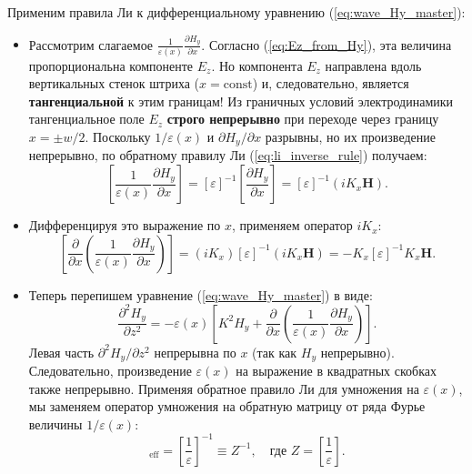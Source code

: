 \documentclass[a4paper,11pt]{article}
\begin{document}
Применим правила Ли к дифференциальному уравнению (\ref{eq:wave_Hy_master}):
\begin{itemize}
    \item Рассмотрим слагаемое $\frac{1}{\varepsilon(x)} \frac{\partial H_y}{\partial x}$. 
    Согласно (\ref{eq:Ez_from_Hy}), эта величина пропорциональна компоненте $E_z$. Но компонента $E_z$ направлена вдоль вертикальных стенок штриха ($x = \text{const}$) и, следовательно, является \textbf{тангенциальной} к этим границам! Из граничных условий электродинамики тангенциальное поле $E_z$ \textbf{строго непрерывно} при переходе через границу $x = \pm w/2$.
    Поскольку $1/\varepsilon(x)$ и $\partial H_y / \partial x$ разрывны, но их произведение непрерывно, по обратному правилу Ли (\ref{eq:li_inverse_rule}) получаем:
    \begin{equation}
        \left[ \frac{1}{\varepsilon(x)} \frac{\partial H_y}{\partial x} \right] = [\varepsilon]^{-1} \left[ \frac{\partial H_y}{\partial x} \right] = [\varepsilon]^{-1} (i K_x \mathbf{H}).
    \end{equation}
    \item Дифференцируя это выражение по $x$, применяем оператор $i K_x$:
    \begin{equation}
        \left[ \frac{\partial}{\partial x} \left( \frac{1}{\varepsilon(x)} \frac{\partial H_y}{\partial x} \right) \right] = (i K_x) [\varepsilon]^{-1} (i K_x \mathbf{H}) = - K_x [\varepsilon]^{-1} K_x \mathbf{H}.
    \end{equation}
    \item Теперь перепишем уравнение (\ref{eq:wave_Hy_master}) в виде:
    \begin{equation}
        \frac{\partial^2 H_y}{\partial z^2} = -\varepsilon(x) \left[ K^2 H_y + \frac{\partial}{\partial x} \left( \frac{1}{\varepsilon(x)} \frac{\partial H_y}{\partial x} \right) \right].
    \end{equation}
    Левая часть $\partial^2 H_y / \partial z^2$ непрерывна по $x$ (так как $H_y$ непрерывно). Следовательно, произведение $\varepsilon(x)$ на выражение в квадратных скобках также непрерывно. Применяя обратное правило Ли для умножения на $\varepsilon(x)$, мы заменяем оператор умножения на обратную матрицу от ряда Фурье величины $1/\varepsilon(x)$:
    \begin{equation}
        [\varepsilon]_{\text{eff}} = \left[ \frac{1}{\varepsilon} \right]^{-1} \equiv Z^{-1}, \quad \text{где } Z = \left[ \frac{1}{\varepsilon} \right].
    \end{equation}
\end{itemize}
\end{document}

